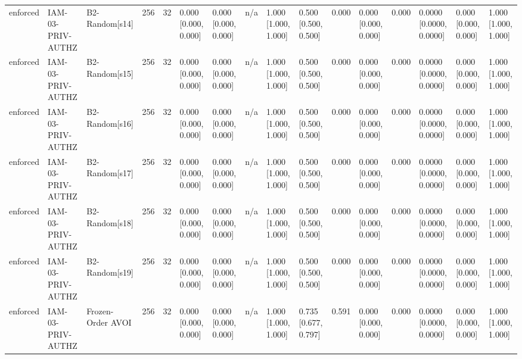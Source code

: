 \begin{table}[!ht]
{\begin{tabular}{llllllllllllllll}
enforced & IAM-03-PRIV-AUTHZ & B2-Random[s14] & 256 & 32 & 0.000 [0.000, 0.000] & 0.000 [0.000, 0.000] & n/a & 1.000 [1.000, 1.000] & 0.500 [0.500, 0.500] & 0.000 & 0.000 [0.000, 0.000] & 0.000 & 0.0000 [0.0000, 0.0000] & 0.000 [0.000, 0.000] & 1.000 [1.000, 1.000] \\
enforced & IAM-03-PRIV-AUTHZ & B2-Random[s15] & 256 & 32 & 0.000 [0.000, 0.000] & 0.000 [0.000, 0.000] & n/a & 1.000 [1.000, 1.000] & 0.500 [0.500, 0.500] & 0.000 & 0.000 [0.000, 0.000] & 0.000 & 0.0000 [0.0000, 0.0000] & 0.000 [0.000, 0.000] & 1.000 [1.000, 1.000] \\
enforced & IAM-03-PRIV-AUTHZ & B2-Random[s16] & 256 & 32 & 0.000 [0.000, 0.000] & 0.000 [0.000, 0.000] & n/a & 1.000 [1.000, 1.000] & 0.500 [0.500, 0.500] & 0.000 & 0.000 [0.000, 0.000] & 0.000 & 0.0000 [0.0000, 0.0000] & 0.000 [0.000, 0.000] & 1.000 [1.000, 1.000] \\
enforced & IAM-03-PRIV-AUTHZ & B2-Random[s17] & 256 & 32 & 0.000 [0.000, 0.000] & 0.000 [0.000, 0.000] & n/a & 1.000 [1.000, 1.000] & 0.500 [0.500, 0.500] & 0.000 & 0.000 [0.000, 0.000] & 0.000 & 0.0000 [0.0000, 0.0000] & 0.000 [0.000, 0.000] & 1.000 [1.000, 1.000] \\
enforced & IAM-03-PRIV-AUTHZ & B2-Random[s18] & 256 & 32 & 0.000 [0.000, 0.000] & 0.000 [0.000, 0.000] & n/a & 1.000 [1.000, 1.000] & 0.500 [0.500, 0.500] & 0.000 & 0.000 [0.000, 0.000] & 0.000 & 0.0000 [0.0000, 0.0000] & 0.000 [0.000, 0.000] & 1.000 [1.000, 1.000] \\
enforced & IAM-03-PRIV-AUTHZ & B2-Random[s19] & 256 & 32 & 0.000 [0.000, 0.000] & 0.000 [0.000, 0.000] & n/a & 1.000 [1.000, 1.000] & 0.500 [0.500, 0.500] & 0.000 & 0.000 [0.000, 0.000] & 0.000 & 0.0000 [0.0000, 0.0000] & 0.000 [0.000, 0.000] & 1.000 [1.000, 1.000] \\
enforced & IAM-03-PRIV-AUTHZ & Frozen-Order AVOI & 256 & 32 & 0.000 [0.000, 0.000] & 0.000 [0.000, 0.000] & n/a & 1.000 [1.000, 1.000] & 0.735 [0.677, 0.797] & 0.591 & 0.000 [0.000, 0.000] & 0.000 & 0.0000 [0.0000, 0.0000] & 0.000 [0.000, 0.000] & 1.000 [1.000, 1.000] \\
\bottomrule
\end{tabular}}
\end{table}
